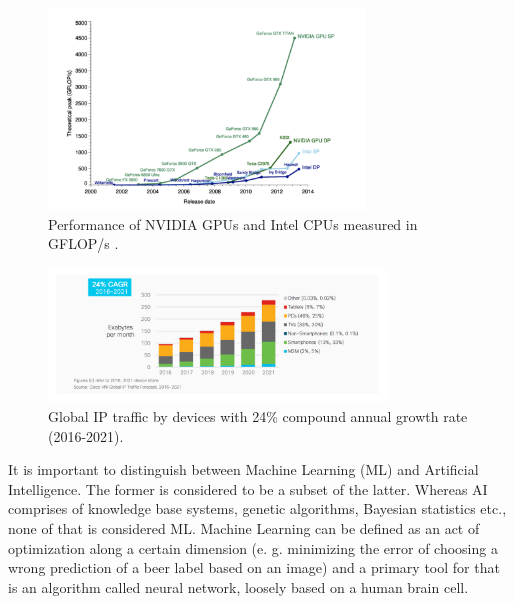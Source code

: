 \documentclass[11pt, a4paper]{article}
\begin{document}
\begin{figure}[H]
\includegraphics[width=0.75\textwidth]{cpu_gpu}
\centering
\caption[Wydajność kart graficznych NVIDIA w porównaniu do procesorów Intel]{Performance of NVIDIA GPUs and Intel CPUs measured in GFLOP/s \cite{cpu_vs_gpu}.}
\label{fig:cpu_gpu}
\end{figure}

\begin{figure}[H]
\includegraphics[width=0.8\textwidth]{cisco_era}
\centering
\caption[Światowy ruch internetowy liczony względem urządzeń]{Global IP traffic by devices \cite{cisco_era} with 24\% compound annual growth rate (2016-2021).}
\label{fig:cisco_era}
\end{figure}

It is important to distinguish between Machine Learning (ML) and Artificial Intelligence. The former is considered to be a subset of the latter. Whereas AI comprises of knowledge base systems, genetic algorithms, Bayesian statistics etc., none of that is considered ML. Machine Learning can be defined as an act of optimization along a certain dimension (e. g. minimizing the error of choosing a wrong prediction of a beer label based on an image) and a primary tool for that is an algorithm called neural network, loosely based on a human brain cell.
\clearpage
\end{document}
